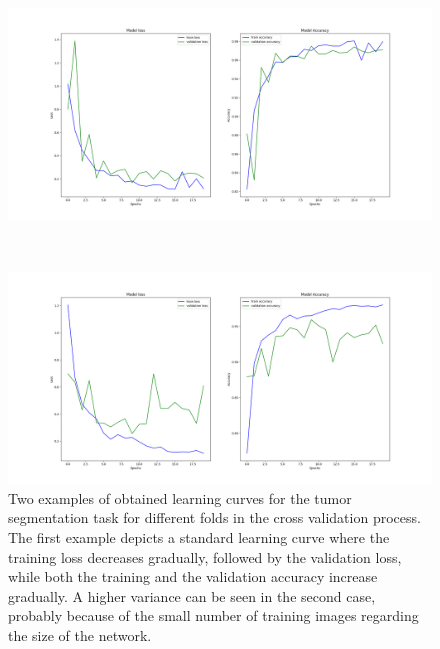 {\begin{figure}[!ht]
\begin{mdframed}[backgroundcolor=blue!50,linecolor=blue!50]
	\centering
	\begin{minipage}{\linewidth}
		\includegraphics[width=\linewidth]{images/learningCurveTumorVE_pat4}
	\end{minipage} \\
	\begin{minipage}{\linewidth}
		\includegraphics[width=\linewidth]{images/learningCurveTumorVE_pat6}
	\end{minipage}
	\caption{Two examples of obtained learning curves for the tumor segmentation task for different folds in the cross validation process. The first example depicts a standard learning curve where the training loss decreases gradually, followed by the validation loss, while both the training and the validation accuracy increase gradually. A higher variance can be seen in the second case, probably because of the small number of training images regarding the size of the network.}
	\label{fig:learningCurvesIJCARS}
	\end{mdframed}
\end{figure}
}


